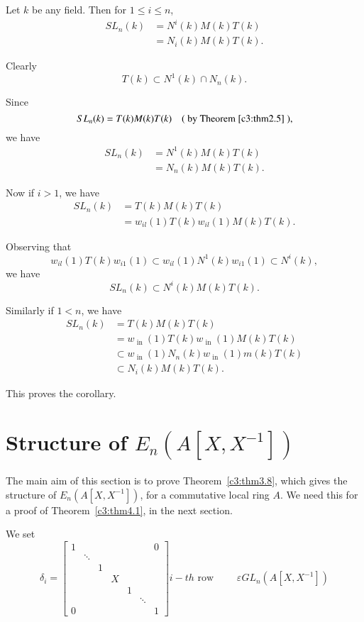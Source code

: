 \begin{coro}\label{c3:coro2.6}
Let $k$ be any field. Then for $1\leq i\leq n$,
\begin{align*}
SL_n(k)&=N^{i}(k)M(k)T(k)\\
&=N_i(k)M(k)T(k).
\end{align*}
\end{coro}

\begin{Proof}
Clearly
$$
T(k)\subset N^{1}(k)\cap N_n(k).
$$

Since
$$
SL_n(k)=T(k)M(k)T(k)\quad (\text{ by Theorem~\ref{c3:thm2.5} }),
$$
we have
\begin{align*}
SL_n(k)&=N^{1}(k)M(k)T(k)\\
&=N_n(k)M(k)T(k).
\end{align*}

Now if $i>1$, we have
\begin{align*}
SL_n(k)&=T(k)M(k)T(k)\\
&=w_{il}(1)T(k)w_{il}(1)M(k)T(k).
\end{align*}

Observing that
$$
w_{il}(1)T(k)w_{i1}(1)\subset w_{il}(1)N^{1}(k)w_{i1}(1)\subset N^{i}(k),
$$
we have
$$
SL_n(k)\subset N^{i}(k)M(k)T(k).
$$

Similarly if $1<n$, we have 
\begin{align*}
SL_n(k)&=T(k)M(k)T(k)\\
&=w_{\text{ in }}(1)T(k)w_{\text{ in }}(1)M(k)T(k)\\
&\subset w_{\text{ in }}(1)N_n(k)w_{\text{ in }}(1)m(k)T(k)\\
&\subset N_i(k)M(k)T(k).
\end{align*}

This proves the corollary.
\enprf
\end{Proof}


\section{Structure of \texorpdfstring{$E_n\left(A\left[X,X^{-1}\right]\right)$}{En}}\label{c3:s3}

The main aim of this section is to prove Theorem~\ref{c3:thm3.8},
which gives the structure of $E_n\left(A\left[X,X^{-1}\right]\right)$,
for a commutative local ring $A$. We need this for a proof of
Theorem~\ref{c3:thm4.1}, in the next section.

We set
$$
\delta_i=
\begin{bmatrix}
1 & & & & & &0\\
& \ddots & && & &\\
& & 1 & & &\\
& & & X & &\\
& & & & 1 &\\
& & & & & \ddots\\
0 & & & & & &1
\end{bmatrix} i-th \text{ row }\qquad \varepsilon GL_n\left(A\left[X,X^{-1}\right]\right)
$$

